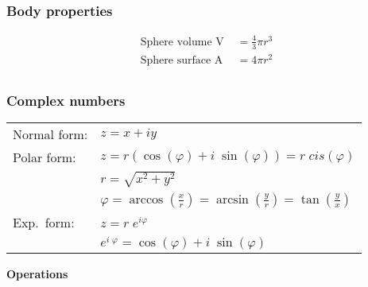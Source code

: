 \subsubsection{Body properties}
\noindent
\begin{align*}
    \text{Sphere volume V }  & = \frac{4}{3}\pi r^3 \\
    \text{Sphere surface A } & = 4\pi r^2           \\
\end{align*}

\subsubsection{Complex numbers}

\renewcommand{\arraystretch}{1.4}

\begin{tabular}{ m{2.4cm}  m{6cm} }
    Normal form: & $z=x+iy$                                                                                               \\
    Polar form:  & $z=r(\cos(\varphi)+ i\; \sin(\varphi))=r\;cis(\varphi)$                                                \\
                 & $r=\sqrt{x^2+y^2}$                                                                                     \\
                 & $\varphi=\arccos\left(\frac{x}{r}\right)=\arcsin\left(\frac{y}{r}\right)=\tan\left(\frac{y}{x}\right)$ \\
    Exp.\ form:  & $z=r\; e^{i\varphi}$                                                                                   \\
                 & $e^{i\; \varphi}=\cos(\varphi)+i\; \sin(\varphi)$
\end{tabular}

\textbf{Operations}

